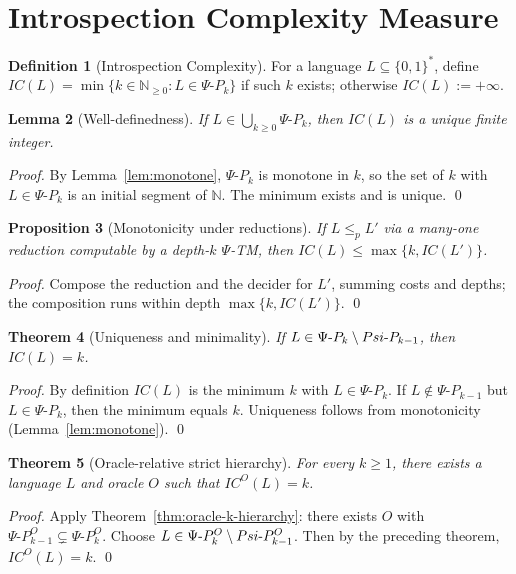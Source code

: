 \documentclass[11pt]{article}
\newtheorem{theorem}{Theorem}[section]
\newtheorem{lemma}[theorem]{Lemma}
\newtheorem{proposition}[theorem]{Proposition}
\theoremstyle{definition}
\newtheorem{definition}[theorem]{Definition}
\newcommand{\PSi}{\Psi}
\newcommand{\bits}{\{0,1\}}
\begin{document}
\section{Introspection Complexity Measure}

\begin{definition}[Introspection Complexity]
For a language $L\subseteq \bits^*$, define $IC(L)=\min\{k\in\mathbb{N}_{\ge0}: L\in \Psi\text{-}P_k\}$ if such $k$ exists; otherwise $IC(L):=+\infty$.
\end{definition}

\begin{lemma}[Well-definedness]
If $L\in\bigcup_{k\ge0} \Psi\text{-}P_k$, then $IC(L)$ is a unique finite integer.
\end{lemma}
\begin{proof}
By Lemma~\ref{lem:monotone}, $\Psi\text{-}P_k$ is monotone in $k$, so the set of $k$ with $L\in\Psi\text{-}P_k$ is an initial segment of $\mathbb{N}$. The minimum exists and is unique. \qed
\end{proof}

\begin{proposition}[Monotonicity under reductions]
If $L\le_p L'$ via a many-one reduction computable by a depth-$k$ $\PSi$-TM, then $IC(L)\le \max\{k, IC(L')\}$.
\end{proposition}
\begin{proof}
Compose the reduction and the decider for $L'$, summing costs and depths; the composition runs within depth $\max\{k,IC(L')\}$. \qed
\end{proof}

\begin{theorem}[Uniqueness and minimality]
If $L\in \Psi\text{-}P_k\\\setminus\\Psi\text{-}P_{k-1}$, then $IC(L)=k$.
\end{theorem}
\begin{proof}
By definition $IC(L)$ is the minimum $k$ with $L\in\Psi\text{-}P_k$. If $L\notin\Psi\text{-}P_{k-1}$ but $L\in\Psi\text{-}P_k$, then the minimum equals $k$. Uniqueness follows from monotonicity (Lemma~\ref{lem:monotone}). \qed
\end{proof}

\begin{theorem}[Oracle-relative strict hierarchy]
For every $k\ge1$, there exists a language $L$ and oracle $O$ such that $IC^{O}(L)=k$.
\end{theorem}
\begin{proof}
Apply Theorem~\ref{thm:oracle-k-hierarchy}: there exists $O$ with $\Psi\text{-}P_{k-1}^{O} \subsetneq \Psi\text{-}P_{k}^{O}$. Choose $L\in\Psi\text{-}P_k^{O}\\\setminus\\Psi\text{-}P_{k-1}^{O}$. Then by the preceding theorem, $IC^{O}(L)=k$. \qed
\end{proof}
\end{document}
